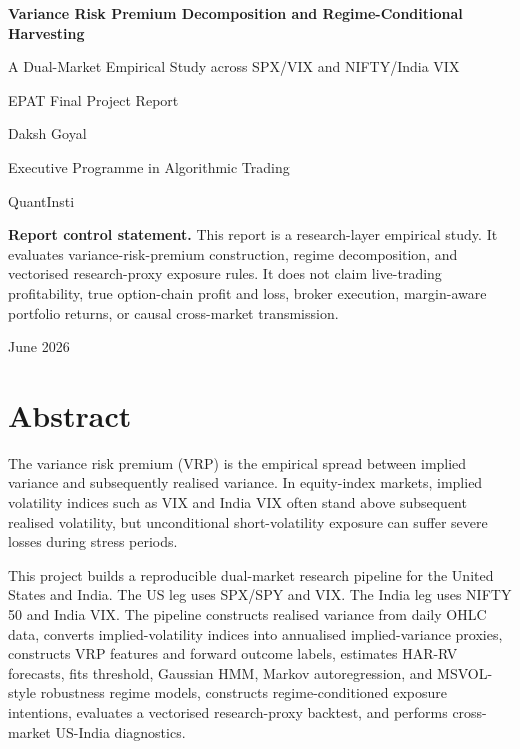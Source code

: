 \documentclass[11pt,a4paper]{article}
\begin{document}
\begin{titlepage}
\centering
\vspace*{1.8cm}
{\LARGE\bfseries Variance Risk Premium Decomposition and Regime-Conditional Harvesting\par}
\vspace{0.35cm}
{\Large A Dual-Market Empirical Study across SPX/VIX and NIFTY/India VIX\par}
\vspace{1.2cm}
{\large EPAT Final Project Report\par}
\vspace{0.6cm}
{\large Daksh Goyal\par}
\vspace{0.2cm}
{\large Executive Programme in Algorithmic Trading\par}
\vspace{0.2cm}
{\large QuantInsti\par}
\vfill
\begin{minipage}{0.88\linewidth}
\small
\textbf{Report control statement.} This report is a research-layer empirical study. It evaluates variance-risk-premium construction, regime decomposition, and vectorised research-proxy exposure rules. It does not claim live-trading profitability, true option-chain profit and loss, broker execution, margin-aware portfolio returns, or causal cross-market transmission.
\end{minipage}
\vfill
{\large June 2026\par}
\end{titlepage}

\tableofcontents
\newpage

\section{Abstract}

The variance risk premium (VRP) is the empirical spread between implied variance and subsequently realised variance. In equity-index markets, implied volatility indices such as VIX and India VIX often stand above subsequent realised volatility, but unconditional short-volatility exposure can suffer severe losses during stress periods.

This project builds a reproducible dual-market research pipeline for the United States and India. The US leg uses SPX/SPY and VIX. The India leg uses NIFTY 50 and India VIX. The pipeline constructs realised variance from daily OHLC data, converts implied-volatility indices into annualised implied-variance proxies, constructs VRP features and forward outcome labels, estimates HAR-RV forecasts, fits threshold, Gaussian HMM, Markov autoregression, and MSVOL-style robustness regime models, constructs regime-conditioned exposure intentions, evaluates a vectorised research-proxy backtest, and performs cross-market US-India diagnostics.
\end{document}
